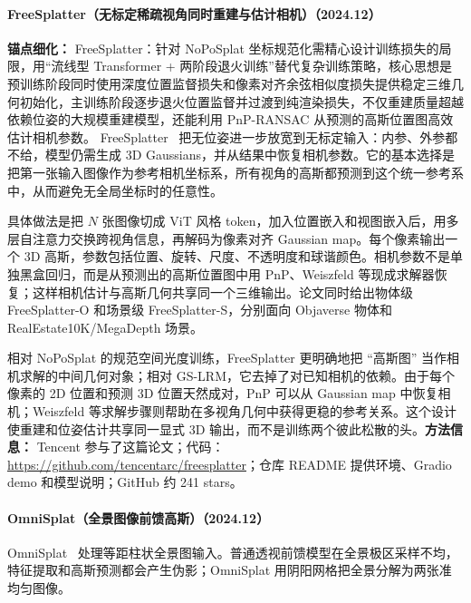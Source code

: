\paragraph{FreeSplatter（无标定稀疏视角同时重建与估计相机）（2024.12）}
\textbf{锚点细化：} FreeSplatter：针对 NoPoSplat 坐标规范化需精心设计训练损失的局限，用``流线型 Transformer + 两阶段退火训练''替代复杂训练策略，核心思想是预训练阶段同时使用深度位置监督损失和像素对齐余弦相似度损失提供稳定三维几何初始化，主训练阶段逐步退火位置监督并过渡到纯渲染损失，不仅重建质量超越依赖位姿的大规模重建模型，还能利用 PnP-RANSAC 从预测的高斯位置图高效估计相机参数。
FreeSplatter~\cite{2412_09573} 把无位姿进一步放宽到无标定输入：内参、外参都不给，模型仍需生成 3D Gaussians，并从结果中恢复相机参数。它的基本选择是把第一张输入图像作为参考相机坐标系，所有视角的高斯都预测到这个统一参考系中，从而避免无全局坐标时的任意性。

具体做法是把 $N$ 张图像切成 ViT 风格 token，加入位置嵌入和视图嵌入后，用多层自注意力交换跨视角信息，再解码为像素对齐 Gaussian map。每个像素输出一个 3D 高斯，参数包括位置、旋转、尺度、不透明度和球谐颜色。相机参数不是单独黑盒回归，而是从预测出的高斯位置图中用 PnP、Weiszfeld 等现成求解器恢复；这样相机估计与高斯几何共享同一个三维输出。论文同时给出物体级 FreeSplatter-O 和场景级 FreeSplatter-S，分别面向 Objaverse 物体和 RealEstate10K/MegaDepth 场景。

相对 NoPoSplat 的规范空间光度训练，FreeSplatter 更明确地把 ``高斯图'' 当作相机求解的中间几何对象；相对 GS-LRM，它去掉了对已知相机的依赖。由于每个像素的 2D 位置和预测 3D 位置天然成对，PnP 可以从 Gaussian map 中恢复相机；Weiszfeld 等求解步骤则帮助在多视角几何中获得更稳的参考关系。这个设计使重建和位姿估计共享同一显式 3D 输出，而不是训练两个彼此松散的头。\textbf{方法信息：} Tencent 参与了这篇论文；代码：\url{https://github.com/tencentarc/freesplatter}；仓库 README 提供环境、Gradio demo 和模型说明；GitHub 约 241 stars。



\paragraph{OmniSplat（全景图像前馈高斯）（2024.12）}
OmniSplat~\cite{2412_16604} 处理等距柱状全景图输入。普通透视前馈模型在全景极区采样不均，特征提取和高斯预测都会产生伪影；OmniSplat 用阴阳网格把全景分解为两张准均匀图像。

